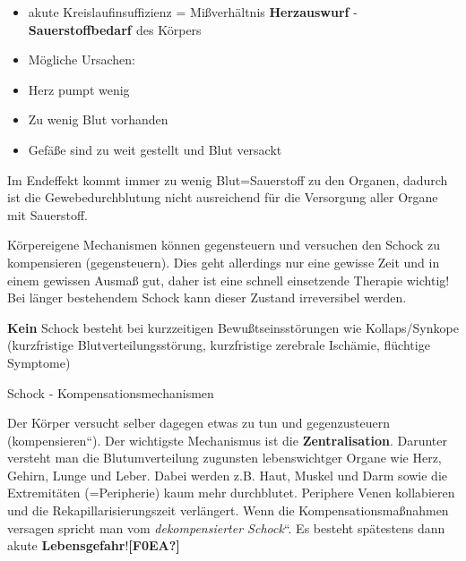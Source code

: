 \documentclass{article}
\newcommand\gEs[1]{\textbf{\textcolor[rgb]{0.0,0.0,0.5019608}{#1}}}
\newcommand\gEs[1]{\textbf{\textcolor[rgb]{0.0,0.0,0.5019608}{#1}}}
\newcommand\gT[1]{\textbf{\textup{\textcolor[rgb]{0.0,0.5019608,0.0}{#1}}}}
\newcommand\gE[1]{\textit{#1}}
\begin{document}
\begin{itemize}
\item {\mdseries
akute Kreislaufinsuffizienz = Mi{\ss}verh\"altnis
\gEs{Herzauswurf} - 
\gEs{Sauerstoffbedarf }des K\"orpers  }

\item {\mdseries
M\"ogliche Ursachen: }

\end{itemize}
\begin{itemize}
\item {\mdseries
Herz pumpt wenig}

\item {\mdseries
Zu wenig Blut vorhanden }

\item {\mdseries
Gef\"a{\ss}e sind zu weit gestellt und Blut versackt}

\end{itemize}
{\mdseries
Im Endeffekt kommt immer zu wenig Blut=Sauerstoff zu den Organen,
dadurch ist die Ge\-webedurchblutung nicht ausreichend  f\"ur die
Versorgung aller Organe mit Sauer\-stoff.}

{\mdseries
K\"orpereigene Mechanismen k\"onnen gegensteuern und versuchen den
Schock zu kompensieren (gegensteuern). Dies geht allerdings nur eine
gewisse Zeit und in einem gewissen Ausma{\ss} gut, daher ist eine
schnell  einsetzende Therapie wichtig! Bei l\"anger bestehendem Schock
kann dieser Zustand irreversibel werden. }

{\mdseries
\textbf{Kein} Schock besteht bei kurzzeitigen 
Bewu{\ss}tseinsst\"orungen wie Kollaps/Synkope (kurzfristige
Blutverteilungsst\"orung, kurzfristige zerebrale Isch\"amie, 
fl\"uchtige Symptome)}

{\mdseries\color{black}
Schock -  Kompensationsmechanismen}

{\mdseries
Der K\"orper versucht selber dagegen etwas zu tun und gegenzusteuern
({\quotedblbase}kompensieren{\textquotedblleft}). Der wichtigste
Mechanismus ist die
\gT{Zentralisation}. Darunter
versteht man die Blutumverteilung zugunsten lebenswichtger Organe wie
Herz, Gehirn, Lunge und Leber. Dabei werden z.B. Haut, Muskel und Darm
sowie die Extremit\"aten (=Peripherie) kaum mehr  durchblutet.
Periphere Venen kollabieren und die Rekapillarisierungszeit
verl\"angert. Wenn die Kompensationsma{\ss}nahmen  versagen spricht man
vom {\quotedblbase}\gE{dekompensierter
Schock}{\textquotedblleft}. Es besteht sp\"atestens dann akute
\gEs{Lebensgefahr}!\textbf{\textcolor[rgb]{0.7882353,0.0,0.08627451}{[F0EA?]}}
}
\end{document}
